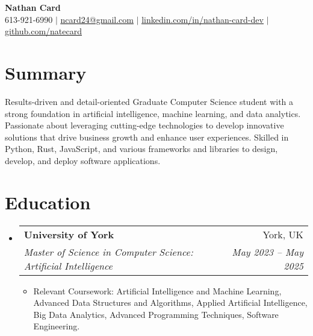 \documentclass[letterpaper,11pt]{article}
\makeatletter
\newcommand{\resumeItem}[1]{
  \item\small{
    {#1 \vspace{-2pt}}
  }
}
\newcommand{\resumeSubheading}[4]{
  \vspace{-2pt}\item
    \begin{tabular*}{0.97\textwidth}[t]{l@{\extracolsep{\fill}}r}
      \textbf{#1} & #2 \\
      \textit{\small#3} & \textit{\small #4} \\
    \end{tabular*}\vspace{-7pt}
}
\newcommand{\resumeSubHeadingListStart}{\begin{itemize}[leftmargin=0.15in, label={}]}
\newcommand{\resumeSubHeadingListEnd}{\end{itemize}}
\newcommand{\resumeItemListStart}{\begin{itemize}}
\newcommand{\resumeItemListEnd}{\end{itemize}\vspace{-5pt}}
\makeatother
\begin{document}

\begin{center}
    \textbf{\Huge Nathan Card} \\ \vspace{1pt}
    \small 613-921-6990 $|$ \href{mailto:x@x.com}{\underline{ncard24@gmail.com}} $|$ 
    \href{https://linkedin.com/in/nathan-card-dev}{\underline{linkedin.com/in/nathan-card-dev}} $|$
    \href{https://github.com/natecard}{\underline{github.com/natecard}}
\end{center}

\section{Summary}
\begin{itemize}[leftmargin=0.15in, rightmargin=0.15in, label={}]
  \small{\item{
    {Results-driven and detail-oriented Graduate Computer Science student with a strong foundation in artificial intelligence, machine learning, and data analytics.}
    {Passionate about leveraging cutting-edge technologies to develop innovative solutions that drive business growth and enhance user experiences.}
    {Skilled in Python, Rust, JavaScript, and various frameworks and libraries to design, develop, and deploy software applications.}
    }}
  \end{itemize}      
    
\section{Education}
  \resumeSubHeadingListStart
    \resumeSubheading
      {University of York}{York, UK}
      {Master of Science in Computer Science: Artificial Intelligence}{May 2023 -- May 2025}
\resumeItemListStart
      \resumeItem{Relevant Coursework: Artificial Intelligence and Machine Learning, Advanced Data Structures and Algorithms, Applied Artificial Intelligence, Big Data Analytics, Advanced Programming Techniques, Software Engineering.}
      \resumeItemListEnd
  \resumeSubHeadingListEnd
\end{document}
